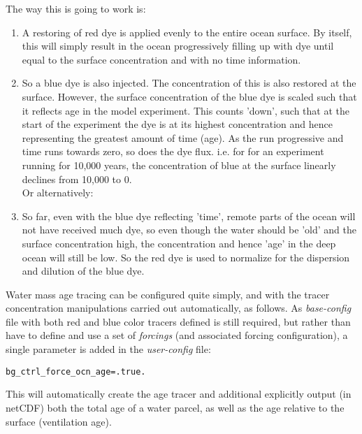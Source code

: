 \documentclass[11pt,fleqn]{book} %
\begin{document}
The way this is going to work is:

\begin{enumerate}
\setlength{\itemindent}{.2in}

\vspace{1mm}
\item A restoring of red dye is applied evenly to the entire ocean surface. By itself, this will simply result in the ocean progressively filling up with dye until equal to the surface concentration and with no time information.

\vspace{1mm}
\item So a blue dye is also injected. The concentration of this is also restored at the surface. However, the surface concentration of the blue dye is scaled such that it reflects age in the model experiment. This counts 'down', such that at the start of the experiment the dye is at its highest concentration and hence representing the greatest amount of time (age). As the run progressive and time runs towards zero, so does the dye flux. i.e. for for an experiment running for 10,000 years, the concentration of blue at the surface linearly declines from 10,000 to 0.
\\Or alternatively:

\vspace{1mm}
\item So far, even with the blue dye reflecting 'time', remote parts of the ocean will not have received much dye, so even though the water should be 'old' and the surface concentration high, the concentration and hence 'age' in the deep ocean will still be low. So the red dye is used to normalize for the dispersion and dilution of the blue dye.

\end{enumerate}
\vspace{2mm}

Water mass age tracing can be configured quite simply, and with the tracer concentration manipulations carried out automatically, as follows. As \textit{base-config} file with both red and blue color tracers defined is still required, but  rather than have to define and use a set of \textit{forcings} (and associated forcing configuration), a single parameter is added in the \textit{user-config} file:
\vspace{-2pt}\begin{verbatim}
bg_ctrl_force_ocn_age=.true.
\end{verbatim}\vspace{-2pt}
This will automatically create the age tracer and additional explicitly output (in netCDF) both the total age of a water parcel, as well as the age relative to the surface (ventilation age).
\end{document}
